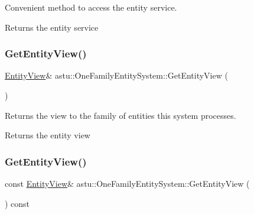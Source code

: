 Convenient method to access the entity service.

\begin{DoxyReturn}{Returns}
the entity service 
\end{DoxyReturn}
\mbox{\label{classastu_1_1OneFamilyEntitySystem_a1d4106716b7298b177615884ffa62f6c}} 
\subsubsection{\texorpdfstring{Get\+Entity\+View()}{GetEntityView()}\hspace{0.1cm}{\footnotesize\ttfamily [1/2]}}
{\footnotesize\ttfamily \hyperlink{group__ecs__group_gace2fb790b86c3908a65e4222f7ac2f4e}{Entity\+View}\& astu\+::\+One\+Family\+Entity\+System\+::\+Get\+Entity\+View (\begin{DoxyParamCaption}{ }\end{DoxyParamCaption})\hspace{0.3cm}{\ttfamily [inline]}}

Returns the view to the family of entities this system processes.

\begin{DoxyReturn}{Returns}
the entity view 
\end{DoxyReturn}
\mbox{\label{classastu_1_1OneFamilyEntitySystem_ae39a5715e61036ef73a18a995c21ab10}} 
\subsubsection{\texorpdfstring{Get\+Entity\+View()}{GetEntityView()}\hspace{0.1cm}{\footnotesize\ttfamily [2/2]}}
{\footnotesize\ttfamily const \hyperlink{group__ecs__group_gace2fb790b86c3908a65e4222f7ac2f4e}{Entity\+View}\& astu\+::\+One\+Family\+Entity\+System\+::\+Get\+Entity\+View (\begin{DoxyParamCaption}{ }\end{DoxyParamCaption}) const\hspace{0.3cm}{\ttfamily [inline]}}

